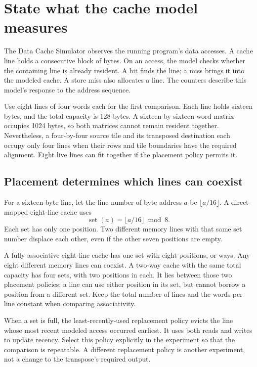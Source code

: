\section{State what the cache model measures}
The Data Cache Simulator observes the running program's data accesses. A cache
line holds a consecutive block of bytes. On an access, the model checks whether
the containing line is already resident. A hit finds the line; a miss brings it
into the modeled cache. A store miss also allocates a line. The counters describe
this model's response to the address sequence.

Use eight lines of four words each for the first comparison. Each line holds
sixteen bytes, and the total capacity is 128 bytes. A sixteen-by-sixteen word
matrix occupies 1024 bytes, so both matrices cannot remain resident together.
Nevertheless, a four-by-four source tile and its transposed destination each
occupy only four lines when their rows and tile boundaries have the required
alignment. Eight live lines can fit together if the placement policy permits it.

\subsection{Placement determines which lines can coexist}
For a sixteen-byte line, let the line number of byte address \(a\) be
\(\lfloor a/16\rfloor\). A direct-mapped eight-line cache uses
\[
  \operatorname{set}(a)=\lfloor a/16\rfloor\bmod8.
\]
Each set has only one position. Two different memory lines with that same set
number displace each other, even if the other seven positions are empty.

A fully associative eight-line cache has one set with eight positions, or ways.
Any eight different memory lines can coexist. A two-way cache with the same total
capacity has four sets, with two positions in each. It lies between those two
placement policies: a line can use either position in its set, but cannot borrow
a position from a different set. Keep the total number of lines and the words
per line constant when comparing associativity.

When a set is full, the least-recently-used replacement policy evicts the line
whose most recent modeled access occurred earliest. It uses both reads and
writes to update recency. Select this policy explicitly in the experiment so
that the comparison is repeatable. A different replacement policy is another
experiment, not a change to the transpose's required output.

